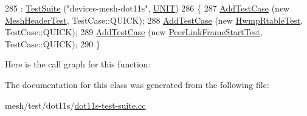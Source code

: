 \begin{DoxyCode}
285   : \hyperlink{classns3_1_1TestSuite_a904b0c40583b744d30908aeb94636d1a}{TestSuite} (\textcolor{stringliteral}{"devices-mesh-dot11s"}, \hyperlink{classns3_1_1TestSuite_a1ebfcab34ec8161e085e8e3a1855eae0a3885375a3787abf60431f8454b3cadbd}{UNIT})
286 \{
287   \hyperlink{classns3_1_1TestCase_a3718088e3eefd5d6454569d2e0ddd835}{AddTestCase} (\textcolor{keyword}{new} \hyperlink{structMeshHeaderTest}{MeshHeaderTest}, TestCase::QUICK);
288   \hyperlink{classns3_1_1TestCase_a3718088e3eefd5d6454569d2e0ddd835}{AddTestCase} (\textcolor{keyword}{new} \hyperlink{classHwmpRtableTest}{HwmpRtableTest}, TestCase::QUICK);
289   \hyperlink{classns3_1_1TestCase_a3718088e3eefd5d6454569d2e0ddd835}{AddTestCase} (\textcolor{keyword}{new} \hyperlink{structPeerLinkFrameStartTest}{PeerLinkFrameStartTest}, TestCase::QUICK);
290 \}
\end{DoxyCode}


Here is the call graph for this function\+:




The documentation for this class was generated from the following file\+:\begin{DoxyCompactItemize}
\item 
mesh/test/dot11s/\hyperlink{dot11s-test-suite_8cc}{dot11s-\/test-\/suite.\+cc}\end{DoxyCompactItemize}
